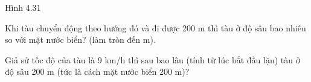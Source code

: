 \begin{exercises}
\begin{questions}[resume=SGK]
\begin{center}
            Hình 4.31
        \end{center}

        \begin{questions}
            \item Khi tàu chuyển động theo hướng đó và đi được 200 m thì tàu ở độ sâu bao nhiêu so với mặt nước biển? (làm tròn đến m).

            \answerline
            \answerline
            \item Giả sử tốc độ của tàu là 9 km/h thì sau bao lâu (tính từ lúc bắt đầu lặn) tàu ở độ sâu 200 m (tức là cách mặt nước biển 200 m)?

            \answerline
            \answerline
            \answerline
        \end{questions}
    \end{questions}
\end{exercises}
